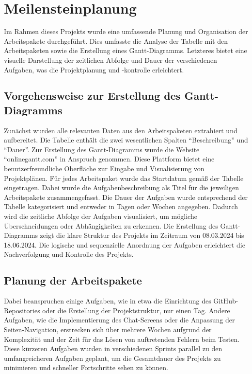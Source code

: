 \chapter{Meilensteinplanung}
Im Rahmen dieses Projekts wurde eine umfassende Planung und Organisation der Arbeitspakete durchgeführt. 
Dies umfasste die Analyse der Tabelle mit den Arbeitspaketen sowie die Erstellung eines Gantt-Diagramms. 
Letzteres bietet eine visuelle Darstellung der zeitlichen Abfolge und Dauer der verschiedenen Aufgaben, was die Projektplanung und -kontrolle erleichtert.

\section{Vorgehensweise zur Erstellung des Gantt-Diagramms}
Zunächst wurden alle relevanten Daten aus den Arbeitspaketen extrahiert und aufbereitet.
Die Tabelle enthält die zwei wesentlichen Spalten \enquote{Beschreibung} und \enquote{Dauer}.
Zur Erstellung des Gantt-Diagramms wurde die Website \enquote{onlinegantt.com} in Anspruch genommen.
Diese Plattform bietet eine benutzerfreundliche Oberfläche zur Eingabe und Visualisierung von Projektplänen.\newline
Für jedes Arbeitspaket wurde das Startdatum gemäß der Tabelle eingetragen.
Dabei wurde die Aufgabenbeschreibung als Titel für die jeweiligen Arbeitspakete zusammengefasst.
Die Dauer der Aufgaben wurde entsprechend der Tabelle kategorisiert und entweder in Tagen oder Wochen angegeben.\newline
Dadurch wird die zeitliche Abfolge der Aufgaben visualisiert, um mögliche Überschneidungen oder Abhängigkeiten zu erkennen. 
Die Erstellung des Gantt-Diagramms zeigt die klare Struktur des Projekts im Zeitraum von 08.03.2024 bis 18.06.2024. 
Die logische und sequenzielle Anordnung der Aufgaben erleichtert die Nachverfolgung und Kontrolle des Projekts.

\section{Planung der Arbeitspakete}
Dabei beanspruchen einige Aufgaben, wie in etwa die Einrichtung des GitHub-Repositories oder die Erstellung der Projektstruktur, nur einen Tag. 
Andere Aufgaben, wie die Implementierung des Chat-Screens oder die Anpassung der Seiten-Navigation, erstrecken sich über mehrere Wochen aufgrund der Komplexität und der Zeit für das Lösen von auftretenden Fehlern beim Testen.
Diese kürzeren Aufgaben wurden in verschiedenen Sprints parallel zu den umfangreicheren Aufgaben geplant, um die Gesamtdauer des Projekts zu minimieren und schneller Fortschritte sehen zu können.

